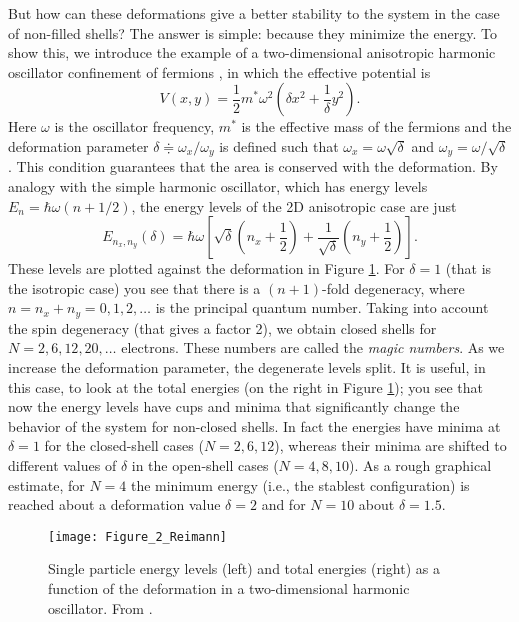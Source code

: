 But how can these deformations give a better stability to the system in the case of non-filled shells? The answer is simple: because they minimize the energy. To show this, we introduce the example of a two-dimensional anisotropic harmonic oscillator confinement of fermions \citep[as in][]{Reimann2002}, in which the effective potential is 
\begin{equation}
	V(x,y) = \frac{1}{2}m^*\omega^2\left(\delta x^2 + \frac{1}{\delta}y^2\right).
\end{equation}
Here $\omega$ is the oscillator frequency, $m^*$ is the effective mass of the fermions and the deformation parameter $\delta \doteqdot \omega_x/\omega_y$ is defined such that $\omega_x=\omega\sqrt{\delta}$ and $\omega_y=\omega/\sqrt{\delta}$. This condition guarantees that the area is conserved with the deformation. By analogy with the simple harmonic oscillator, which has energy levels $E_n = \hbar\omega(n+1/2)$, the energy levels of the 2D anisotropic case are just
\begin{equation}
	E_{n_x,n_y}(\delta) = \hbar\omega\left[\sqrt{\delta}\left(n_x+\frac{1}{2}\right) + \frac{1}{\sqrt{\delta}}\left(n_y+\frac{1}{2}\right)\right].
\end{equation}
These levels are plotted against the deformation in Figure \ref{fig:Figure_2_Reimann}. For $\delta=1$ (that is the isotropic case) you see that there is a $(n+1)$-fold degeneracy, where $n=n_x+n_y=0,1,2,\ldots$ is the principal quantum number. Taking into account the spin degeneracy (that gives a factor 2), we obtain closed shells for $N=2,6,12,20,\ldots$ electrons. These numbers are called the \emph{magic numbers}. As we increase the deformation parameter, the degenerate levels split. It is useful, in this case, to look at the total energies (on the right in Figure \ref{fig:Figure_2_Reimann}); you see that now the energy levels have cups and minima that significantly change the behavior of the system for non-closed shells. In fact the energies have minima at $\delta=1$ for the closed-shell cases ($N=2,6,12$), whereas their minima are shifted to different values of $\delta$ in the open-shell cases ($N=4,8,10$). As a rough graphical estimate, for $N=4$ the minimum energy (i.e., the stablest configuration) is reached about a deformation value $\delta=2$ and for $N=10$ about $\delta=1.5$.

\begin{figure}[H]
	\centering
    \texttt{[image: Figure\_2\_Reimann]}
    \caption{Single particle energy levels (left) and total energies (right) as a function of the deformation in a two-dimensional harmonic oscillator. From \cite{Reimann2002}.}
	\label{fig:Figure_2_Reimann}
\end{figure}

